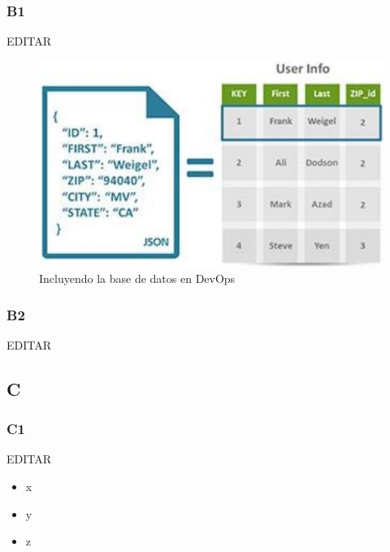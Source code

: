\documentclass[preprint,12pt]{elsarticle}
\begin{document}
\subsubsection{\textbf{B1}}

EDITAR\\

\begin{figure}[htb]
	\begin{center}
		\includegraphics[width=14cm]{./IMAGENES/basededatos_1} 
		\caption{Incluyendo la base de datos en DevOps}
	\end{center}
\end{figure}

\subsubsection{\textbf{B2}}

EDITAR\\

\subsection{\textbf{C}}

\subsubsection{\textbf{C1}}

EDITAR\\

\begin{itemize}

\item x
\item y
\item z

\end{itemize}
\end{document}

